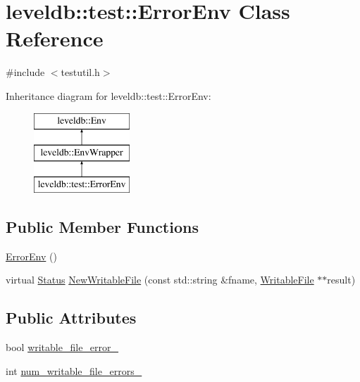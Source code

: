 \hypertarget{classleveldb_1_1test_1_1_error_env}{}\section{leveldb\+:\+:test\+:\+:Error\+Env Class Reference}
\label{classleveldb_1_1test_1_1_error_env}


{\ttfamily \#include $<$testutil.\+h$>$}

Inheritance diagram for leveldb\+:\+:test\+:\+:Error\+Env\+:\begin{figure}[H]
\begin{center}
\leavevmode
\includegraphics[height=3.000000cm]{classleveldb_1_1test_1_1_error_env}
\end{center}
\end{figure}
\subsection*{Public Member Functions}
\begin{DoxyCompactItemize}
\item 
\hyperlink{classleveldb_1_1test_1_1_error_env_aa9d0985b519b252aec24cca8fe89c8b7}{Error\+Env} ()
\item 
virtual \hyperlink{classleveldb_1_1_status}{Status} \hyperlink{classleveldb_1_1test_1_1_error_env_a2990be71c7fb9473bd1fa0f8da8fd078}{New\+Writable\+File} (const std\+::string \&fname, \hyperlink{classleveldb_1_1_writable_file}{Writable\+File} $\ast$$\ast$result)
\end{DoxyCompactItemize}
\subsection*{Public Attributes}
\begin{DoxyCompactItemize}
\item 
bool \hyperlink{classleveldb_1_1test_1_1_error_env_ae3593b752dff671f24f3637376e1cf22}{writable\+\_\+file\+\_\+error\+\_\+}
\item 
int \hyperlink{classleveldb_1_1test_1_1_error_env_afa4564355d86107c8ed0d6efe53eadef}{num\+\_\+writable\+\_\+file\+\_\+errors\+\_\+}
\end{DoxyCompactItemize}
